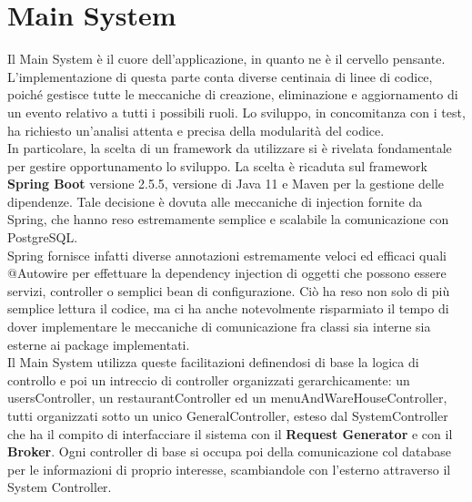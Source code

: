 \section{Main System}
Il Main System è il cuore dell'applicazione, in quanto ne è il cervello pensante. L'implementazione di questa parte conta diverse centinaia di linee di codice, poiché gestisce tutte le meccaniche di creazione, eliminazione e aggiornamento di un evento relativo a tutti i possibili ruoli. Lo sviluppo, in concomitanza con i test, ha richiesto un'analisi attenta e precisa della modularità del codice. 
\\In particolare, la scelta di un framework da utilizzare si è rivelata fondamentale per gestire opportunamento lo sviluppo. La scelta è ricaduta sul framework \textbf{Spring Boot} versione 2.5.5, versione di Java 11 e Maven per la gestione delle dipendenze. Tale decisione è dovuta alle meccaniche di injection fornite da Spring, che hanno reso estremamente semplice e scalabile la comunicazione con PostgreSQL. 
\\Spring fornisce infatti diverse annotazioni estremamente veloci ed efficaci quali @Autowire per effettuare la dependency injection di oggetti che possono essere servizi, controller o semplici bean di configurazione. Ciò ha reso non solo di più semplice lettura il codice, ma ci ha anche notevolmente risparmiato il tempo di dover implementare le meccaniche di comunicazione fra classi sia interne sia esterne ai package implementati. \vspace{0.5cm}
\\Il Main System utilizza queste facilitazioni definendosi di base la logica di controllo e poi un intreccio di controller organizzati gerarchicamente: un usersController, un restaurantController ed un menuAndWareHouseController, tutti organizzati sotto un unico GeneralController, esteso dal SystemController che ha il compito di interfacciare il sistema con il \textbf{Request Generator} e con il \textbf{Broker}. Ogni controller di base si occupa poi della comunicazione col database per le informazioni di proprio interesse, scambiandole con l'esterno attraverso il System Controller.

